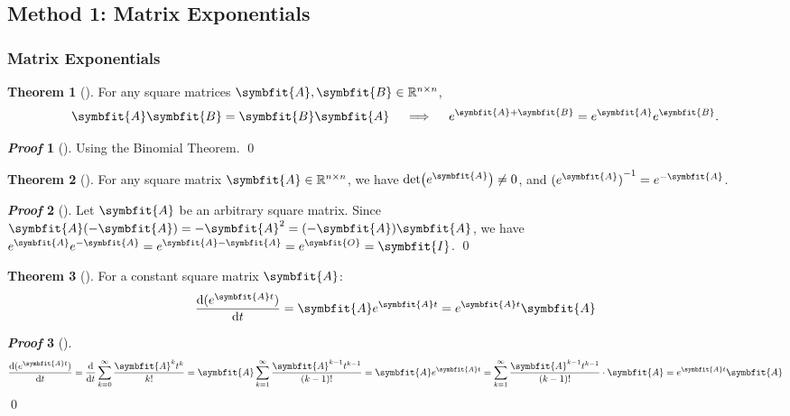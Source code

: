 \documentclass[10pt,UTF8]{article}
\newcommand{\mat}[1]{\symbfit{#1}}
\newenvironment{theoremBox}
{ \bigskip
  \begin{tcolorbox}[colback=yellow!5!white,colframe=yellow!75!black,parbox=false,before
  upper=\par,before lower=\par]}
  {
\end{tcolorbox}}
\theoremstyle{definition}
\newtheorem{definition inner}{Definition}[section]
\theoremstyle{definition}
\newtheorem{theorem inner}{Theorem}[section]
\newenvironment{theorem}[1][]
{
  \begin{theoremBox}
  \begin{theorem inner}[#1]\hfill\par}
    {
    \end{theorem inner}
\end{theoremBox}}
\theoremstyle{definition}
\newtheorem*{proof inner}{\textit{Proof}}
\renewenvironment{proof}[1][]
{
\begin{proof inner}[#1]\hfill\par}
  {\qed\vphantom{.}
\end{proof inner}}
\theoremstyle{plain}
\newtheorem{tip inner}{Tip}[section]
\theoremstyle{remark}
\begin{document}
\subsection{Method 1: Matrix Exponentials}

\subsubsection{Matrix Exponentials}

\begin{theorem}
  {}\label{thm: exp of sum of commuting matrices}
  For any square matrices \(\mat{A}, \mat{B} \in \mathbb{R}^{n \times n}\),
  \begin{equation*}
    \mat{A} \mat{B} = \mat{B} \mat{A}
    \quad\implies\quad
    e^{\mat{A} + \mat{B}} = e^{\mat{A}} e^{\mat{B}}.
  \end{equation*}
\end{theorem}
\begin{proof}
  Using the Binomial Theorem.
\end{proof}

\begin{theorem}
  {}\label{thm: inv of mat exp}
  For any square matrix \(\mat{A} \in \mathbb{R}^{n \times n}\),
  we have \(\det(e^{\mat{A}}) \ne 0\),
  and \({(e^{\mat{A}})}^{-1} = e^{-\mat{A}}\).
\end{theorem}
\begin{proof}
  Let \(\mat{A}\) be an arbitrary square matrix.
  Since \(\mat{A}(-\mat{A}) = -\mat{A}^2 = (-\mat{A})\mat{A}\),
  we have
  \(e^{\mat{A}} e^{-\mat{A}} = e^{\mat{A} - \mat{A}} = e^{\mat{O}} = \mat{I}\).
\end{proof}

\begin{theorem}
  {}\label{thm: derivative of mat exp}
  For a constant square matrix \(\mat{A}\):
  \begin{equation*}
    \dv{(e^{\mat{A} t})}{t} = \mat{A} e^{\mat{A} t} = e^{\mat{A} t} \mat{A}
  \end{equation*}
\end{theorem}
\begin{proof}
  \begin{equation*}
    \dv{(e^{\mat{A} t})}{t}
    = \dv{t} \sum_{k=0}^{\infty} \frac{\mat{A}^k t^k}{k!}
    = \mat{A} \sum_{k=1}^{\infty} \frac{\mat{A}^{k-1} t^{k-1}}{(k-1)!}
    = \mat{A} e^{\mat{A} t}
    = \sum_{k=1}^{\infty} \frac{\mat{A}^{k-1} t^{k-1}}{(k-1)!} \cdot \mat{A}
    = e^{\mat{A} t} \mat{A}
  \end{equation*}
\end{proof}
\end{document}
